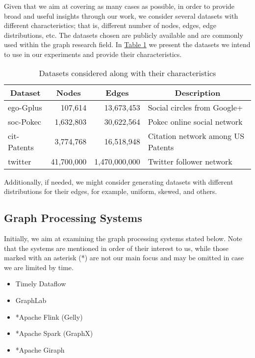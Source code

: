 \documentclass[a4paper,11pt]{article}
\begin{document}
\par Given that we aim at covering as many cases as possible, in order to provide broad and useful insights through our work, we consider several datasets with different characteristics; that is, different number of nodes, edges, edge distributions, etc. The datasets chosen are publicly available and are commonly used within the graph research field. In \hyperref[dataset-table]{Table 1} we present the datasets we intend to use in our experiments and provide their characteristics.

\bigskip

\begin{table}[H]
	\centering
	\begin{tabular}{|l|r|r|l|}
	\hline
	\multicolumn{1}{|c|}{\textbf{Dataset}} & \multicolumn{1}{c|}{\textbf{Nodes}} & \multicolumn{1}{c|}{\textbf{Edges}} & \multicolumn{1}{c|}{\textbf{Description}} \\ \hline
	\hline
	ego-Gplus \cite{snapnets} & 107,614 & 13,673,453 & Social circles from Google+ \\ \hline
	soc-Pokec \cite{snapnets} & 1,632,803 & 30,622,564 & Pokec online social network \\ \hline
	cit-Patents \cite{snapnets} & 3,774,768 & 16,518,948 & Citation network among US Patents \\ \hline
	twitter \cite{twitter} & 41,700,000 & 1,470,000,000 & Twitter follower network \\ \hline
	\end{tabular}
	\caption{Datasets considered along with their characteristics}
	\label{dataset-table}
\end{table}

\par Additionally, if needed, we might consider generating datasets with different distributions for their edges, for example, uniform, skewed, and others.

\subsection{Graph Processing Systems} \label{graph-proc}

\par Initially, we aim at examining the graph processing systems stated below. Note that the systems are mentioned in order of their interest to us, while those marked with an asterisk (*) are not our main focus and may be omitted in case we are limited by time.

\begin{itemize}

	\item Timely Dataflow \cite{naiad, timelydf}
	\item GraphLab \cite{graphlab}
	\item *Apache Flink (Gelly) \cite{flink}
	\item *Apache Spark (GraphX) \cite{spark,graphxpaper}
	\item *Apache Giraph \cite{giraph}

\end{itemize}
\end{document}
